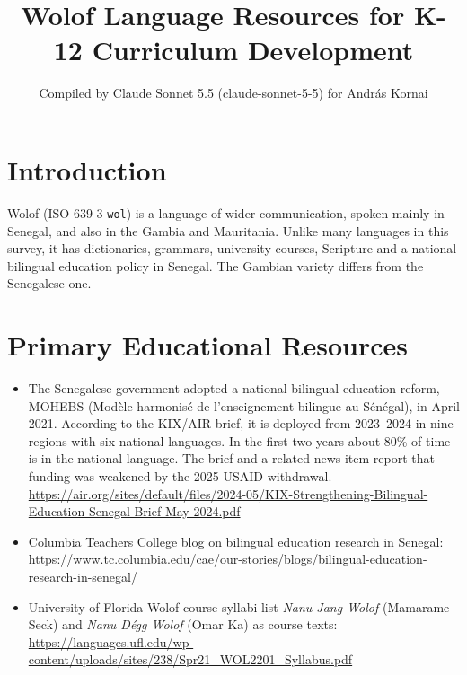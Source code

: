 \documentclass[12pt]{article}
\title{Wolof Language Resources for K-12 Curriculum Development}
\author{Compiled by Claude Sonnet 5.5 (claude-sonnet-5-5) for Andr\'as Kornai}
\date{}
\begin{document}
\maketitle

\section{Introduction}
Wolof (ISO 639-3 \texttt{wol}) is a language of wider communication, spoken mainly in Senegal, and also in the Gambia and Mauritania. Unlike many languages in this survey, it has dictionaries, grammars, university courses, Scripture and a national bilingual education policy in Senegal. The Gambian variety differs from the Senegalese one.

\section{Primary Educational Resources}
\begin{itemize}
\item The Senegalese government adopted a national bilingual education reform, MOHEBS (Mod\`ele harmonis\'e de l'enseignement bilingue au S\'en\'egal), in April 2021. According to the KIX/AIR brief, it is deployed from 2023--2024 in nine regions with six national languages. In the first two years about 80\% of time is in the national language. The brief and a related news item report that funding was weakened by the 2025 USAID withdrawal. \url{https://air.org/sites/default/files/2024-05/KIX-Strengthening-Bilingual-Education-Senegal-Brief-May-2024.pdf}
\item Columbia Teachers College blog on bilingual education research in Senegal: \url{https://www.tc.columbia.edu/cae/our-stories/blogs/bilingual-education-research-in-senegal/}
\item University of Florida Wolof course syllabi list \emph{Nanu Jang Wolof} (Mamarame Seck) and \emph{Nanu D\'egg Wolof} (Omar Ka) as course texts: \url{https://languages.ufl.edu/wp-content/uploads/sites/238/Spr21_WOL2201_Syllabus.pdf}
\end{itemize}
\end{document}
